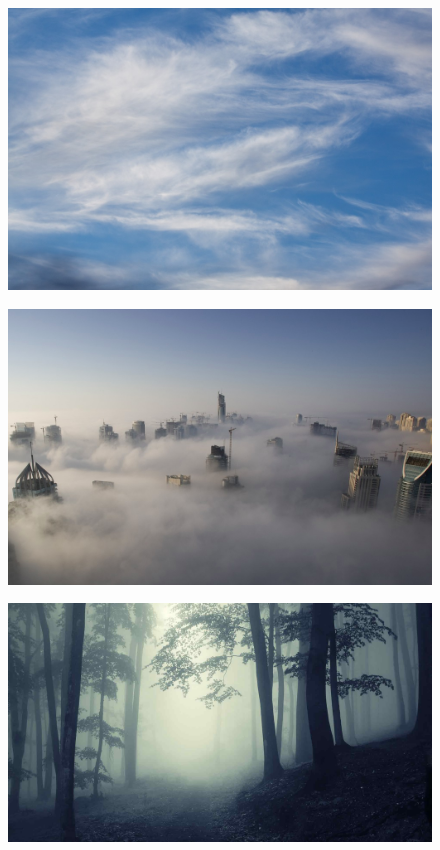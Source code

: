 \begin{figure}[H]
    \centering
    \includegraphics[width=\linewidth]{fogs/fog10.jpg} 
    \caption{}
    \label{fig:r10}
\end{figure}

\begin{figure}[H]
    \centering
    \includegraphics[width=\linewidth]{fogs/fog11.jpg} 
    \caption{}
    \label{fig:r11}
\end{figure}

\begin{figure}[H]
    \centering
    \includegraphics[width=\linewidth]{fogs/fog12.jpg} 
    \caption{}
    \label{fig:r12}
\end{figure}

